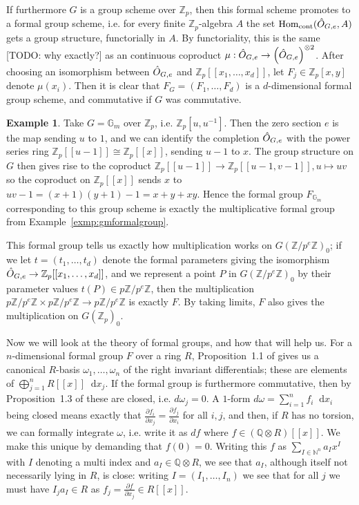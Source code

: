 \documentclass{article}
\newcommand{\N}{\mathbb{N}}
\newcommand{\Z}{\mathbb{Z}}
\renewcommand{\G}{\mathbb{G}}
\newcommand{\Q}{\mathbb{Q}}
\newcommand*\diff{\mathop{}\!\mathrm{d}}
\newcommand{\tensor}{\otimes}
\DeclareMathOperator{\Hom}{Hom}
\theoremstyle{plain}
\theoremstyle{definition}
\newtheorem{exmp}[thm]{Example} %
\theoremstyle{remark}
\begin{document}
If furthermore $G$ is a group scheme over $\Z_p$, then this formal scheme promotes to a formal group scheme, i.e. for every finite $\Z_p$-algebra $A$ the set $\Hom_{\text{cont}}(\Hat{O}_{G,e},A)$ gets a group structure, functorially in $A$. By functoriality, this is the same [TODO: why exactly?] as an continuous coproduct $\mu: \Hat{O}_{G,e} \to \left(\Hat{O}_{G,e}\right)^{\tensor 2}$. After choosing an isomorphism between $\Hat{O}_{G,e}$ and $\Z_p[[x_1,\dots,x_d]]$, let $F_j \in \Z_p[x,y]$ denote $\mu(x_i)$. Then it is clear that $F_G = (F_1,\dots,F_d)$ is a $d$-dimensional formal group scheme, and commutative if $G$ was commutative.
\begin{exmp}
\label{exmp:gmtoformal} %
Take $G = \G_m$ over $\Z_p$, i.e. $\Z_p[u,u^{-1}]$. Then the zero section $e$ is the map sending $u$ to $1$, and we can identify the completion $\Hat{O}_{G,e}$ with the power series ring $\Z_p[[u-1]] \cong \Z_p[[x]]$, sending $u-1$ to $x$. The group structure on $G$ then gives rise to the coproduct $\Z_p[[u-1]] \to \Z_p[[u-1,v-1]], u \mapsto uv$ so the coproduct on $\Z_p[[x]]$ sends $x$ to $uv-1 = (x+1)(y+1) -1 = x + y + xy$. Hence the formal group $F_{\G_m}$ corresponding to this group scheme is exactly the multiplicative formal group from Example~\ref{exmp:gmformalgroup}.
\end{exmp}

This formal group tells us exactly how multiplication works on $G(\Z/p^e\Z)_0$; if we let $t = (t_1,\dots,t_d)$ denote the formal parameters giving the isomorphism $\Hat{O}_{G,e} \to \Z_p[[x_1,\dots,x_d]]$, and we represent a point $P$ in $G(\Z/p^e\Z)_0$ by their parameter values $t(P) \in p\Z/p^e\Z$, then the multiplication $p\Z/p^e\Z \times p\Z/p^e\Z \to p\Z/p^e\Z$ is exactly $F$. By taking limits, $F$ also gives the multiplication on $G(\Z_p)_0$.

Now we will look at the theory of formal groups, and how that will help us. For a $n$-dimensional formal group $F$ over a ring $R$, Proposition~1.1 of \citep{honda70} gives us a canonical $R$-basis $\omega_1,\dots,\omega_n$ of the right invariant differentials; these are elements of $\bigoplus_{j=1}^n R[[x]] \diff x_j$. If the formal group is furthermore commutative, then by Proposition~1.3 of \citep{honda70} these are closed, i.e. $d\omega_j = 0$. A $1$-form $d\omega = \sum_{i=1}^n f_i \diff x_i$ being closed means exactly that $\frac{\partial f_i}{\partial x_j} = \frac{\partial f_j}{\partial x_i}$ for all $i,j$, and then, if $R$ has no torsion, we can formally integrate $\omega$, i.e. write it as $df$ where $f \in (\Q\tensor R)[[x]]$. We make this unique by demanding that $f(0) = 0$. Writing this $f$ as $\sum_{I \in \N^n} a_I x^I$ with $I$ denoting a multi index and $a_I \in \Q\tensor R$, we see that $a_I$, although itself not necessarily lying in $R$, is close: writing $I = (I_1,\dots,I_n)$ we see that for all $j$ we must have $I_j a_I \in R$ as $f_j = \frac{\partial f}{\partial x_j} \in R[[x]]$.
\end{document}

